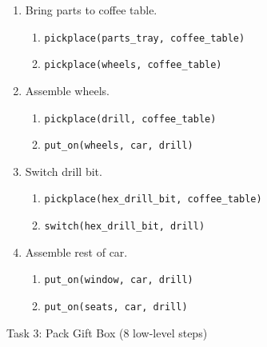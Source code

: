 \begin{enumerate}
    \item Bring parts to coffee table.
        \begin{enumerate}
            \item \texttt{pickplace(parts\_tray, coffee\_table)}
            \item \texttt{pickplace(wheels, coffee\_table)}
        \end{enumerate}
    \item Assemble wheels.
        \begin{enumerate}
            \item \texttt{pickplace(drill, coffee\_table)}
            \item \texttt{put\_on(wheels, car, drill)}
        \end{enumerate}
    \item Switch drill bit.
        \begin{enumerate}
            \item \texttt{pickplace(hex\_drill\_bit, coffee\_table)}
            \item \texttt{switch(hex\_drill\_bit, drill)}
        \end{enumerate}
    \item Assemble rest of car.
        \begin{enumerate}
            \item \texttt{put\_on(window, car, drill)}
            \item \texttt{put\_on(seats, car, drill)}
        \end{enumerate}
\end{enumerate}
Task 3: Pack Gift Box (8 low-level steps)
